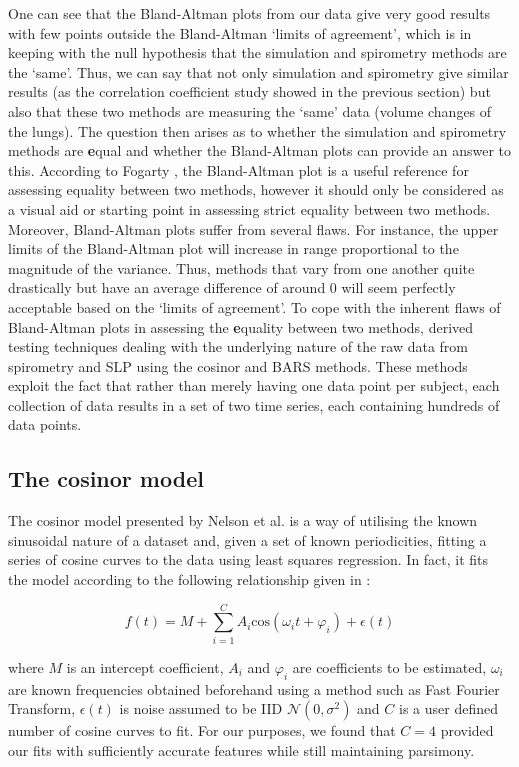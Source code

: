 One can see that the Bland-Altman plots from our data give very good results with few points outside the Bland-Altman `limits of agreement', which is in keeping with the null hypothesis that the simulation and spirometry methods are the `same'. Thus, we can say that not only simulation and spirometry give similar results (as the correlation coefficient study showed in the previous section) but also that these two methods are measuring the `same' data (volume changes of the lungs). The question then arises as to whether the simulation and spirometry methods are {\textbf equal} and whether the Bland-Altman plots can provide an answer to this.
According to Fogarty \cite{fogarty2011slp}, the Bland-Altman plot is a useful reference for assessing equality between two methods, however it should only be considered as a visual aid or starting point in assessing strict equality between two methods. Moreover, Bland-Altman plots suffer from several flaws. For instance, the upper limits of the Bland-Altman plot will increase in range proportional to the magnitude of the variance. Thus, methods that vary from one another quite drastically but have an average difference of around 0 will seem perfectly acceptable based on the `limits of agreement'. To cope with the inherent flaws of Bland-Altman plots in assessing the {\textbf equality} between two methods, \cite{fogarty2011slp} derived testing techniques dealing with the underlying nature of the raw data from spirometry and SLP using the cosinor and BARS methods. These methods exploit the fact that rather than merely having one data point per subject, each collection of data results in a set of two time series, each containing hundreds of data points.

\subsection{The cosinor model}
The cosinor model presented by Nelson et al. \cite{nelson1979methods} is a way of utilising the known sinusoidal nature of a dataset and, given a set of known periodicities, fitting a series of cosine curves to the data using least squares regression. In fact, it fits the model according to the following relationship given in \cite{alberola2003simple}:

\begin{equation}
f(t)=M+\displaystyle\sum\limits_{i=1}^C A_{i} \mathrm{cos}(\omega_{i} t + \varphi_{i}) + \epsilon(t)
\end{equation}
 
where $M$ is an intercept coefficient, $A_{i}$ and $\varphi_{i}$ are coefficients to be estimated, $\omega_{i}$ are known frequencies obtained beforehand using a method such as Fast Fourier Transform, $\epsilon(t)$ is noise assumed to be IID $\mathcal{N}(0,\sigma^2)$ and $C$ is a user defined number of cosine curves to fit. For our purposes, we found that $C=4$ provided our fits with sufficiently accurate features while still maintaining parsimony.

